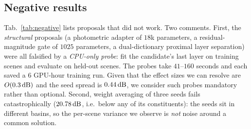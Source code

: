 \subsection{Negative results}
\label{sec:negative}



Tab.~\ref{tab:negative} lists proposals that did not work. Two comments. First, the
\emph{structural} proposals (a photometric adapter of $18$k parameters, a residual-magnitude gate
of $1025$ parameters, a dual-dictionary proximal layer separation) were all falsified by a
\emph{CPU-only probe}: fit the candidate's last layer on training scenes and evaluate on held-out
scenes. The probes take $41$--$160$ seconds and each saved a $6$ GPU-hour training run. Given that
the effect sizes we can resolve are $O(0.3\,\mathrm{dB})$ and the seed spread is $0.44\,\mathrm{dB}$, we consider such
probes mandatory rather than optional. Second, weight averaging of three seeds fails catastrophically
($20.78\,\mathrm{dB}$, i.e.\ below any of its constituents): the seeds sit in different basins, so the
per-scene variance we observe is \emph{not} noise around a common solution.
